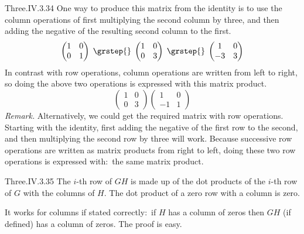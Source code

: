 \begin{ans}{Three.IV.3.34}
      One way to produce this matrix from the identity is to use
      the column operations
      of first multiplying the second column by three, and then adding the
      negative of the resulting second column to the first.
      \begin{equation*}
        \begin{pmatrix}
          1  &0  \\
          0  &1
        \end{pmatrix}
        \;\grstep{}\;
        \begin{pmatrix}
          1  &0  \\
          0  &3
        \end{pmatrix}
        \;\grstep{}\;
        \begin{pmatrix}
          1  &0  \\
          -3  &3
        \end{pmatrix}
      \end{equation*}
      In contrast with row operations, column operations are written from
      left to right, so doing the above two operations
      is expressed with this matrix product.
      \begin{equation*}
        \begin{pmatrix}
          1  &0  \\
          0  &3
        \end{pmatrix}
        \begin{pmatrix}
          1  &0  \\
         -1  &1
        \end{pmatrix}
      \end{equation*}
      \textit{Remark.}
      Alternatively, we could get the required matrix with row operations.
      Starting with the identity, first adding the negative of the first
      row to the  second, and then multiplying the second row by three
      will work.
      Because successive row operations are written as matrix products from
      right to left, doing these two row operations is expressed with:~the
      same matrix product.
    
\end{ans}
\begin{ans}{Three.IV.3.35}
      The \( i \)-th row of \( GH \) is made up of the dot products of
      the \( i \)-th row of \( G \) with the columns of \( H \).
      The dot product of a zero row with a column is zero.

      It works for columns if stated correctly:~if \( H \) has a column of
      zeros then \( GH \) (if defined) has a column of zeros.
      The proof is easy.
    
\end{ans}
